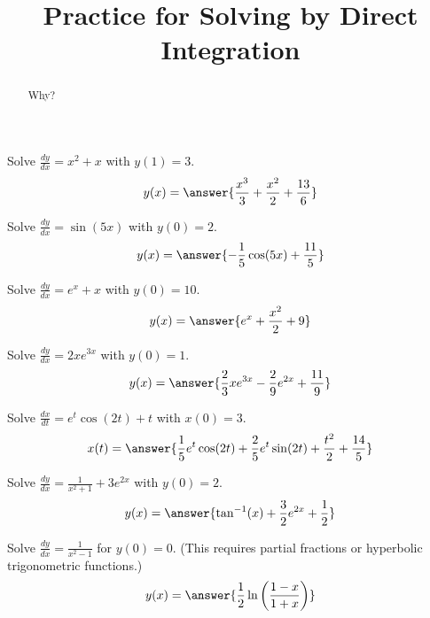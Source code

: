 \documentclass{ximera}
\title{Practice for Solving by Direct Integration}
\begin{document}
\begin{abstract}
    Why?
\end{abstract}
\maketitle


\begin{exercise}
    Solve $\frac{dy}{dx} = x^2+x$ with $y(1)=3$.
    \[
        y(x) = \answer{\frac{x^3}{3} + \frac{x^2}{2} + \frac{13}{6}}
    \]
\end{exercise}

\begin{exercise}
    Solve $\frac{dy}{dx} = \sin (5x)$ with $y(0)=2$.
    \[
        y(x) = \answer{-\frac{1}{5}\cos(5x) + \frac{11}{5}}
    \]
\end{exercise}

\begin{exercise}%
    Solve $\frac{dy}{dx} = e^x + x$ with $y(0) = 10$.
    \[
        y(x) = \answer{e^x + \frac{x^2}{2} + 9}
    \]
\end{exercise}

\begin{exercise}
    Solve $\frac{dy}{dx} = 2xe^{3x}$ with $y(0) = 1$. 
    \[
        y(x) = \answer{\frac{2}{3}xe^{3x} - \frac{2}{9}e^{2x} + \frac{11}{9}}
    \]
\end{exercise}

\begin{exercise}
    Solve $\frac{dx}{dt} = e^t\cos(2t) + t$ with $x(0) = 3$. 
    \[
        x(t) = \answer{\frac{1}{5}e^t\cos(2t) + \frac{2}{5}e^t\sin(2t) + \frac{t^2}{2} + \frac{14}{5}}
    \]
\end{exercise}

\begin{exercise}
    Solve $\frac{dy}{dx} = \frac{1}{x^2 + 1} + 3e^{2x}$ with $y(0) =2$. 
    \[
        y(x) = \answer{\tan^{-1}(x) + \frac{3}{2}e^{2x} + \frac{1}{2}}
    \]
\end{exercise}

\begin{exercise}
    Solve $\frac{dy}{dx} = \frac{1}{x^2-1}$ for $y(0)=0$. (This requires partial fractions or hyperbolic trigonometric functions.)
    \[
        y(x) = \answer{\frac{1}{2}\ln\left(\frac{1-x}{1+x}\right)}
    \]
\end{exercise}
\end{document}
